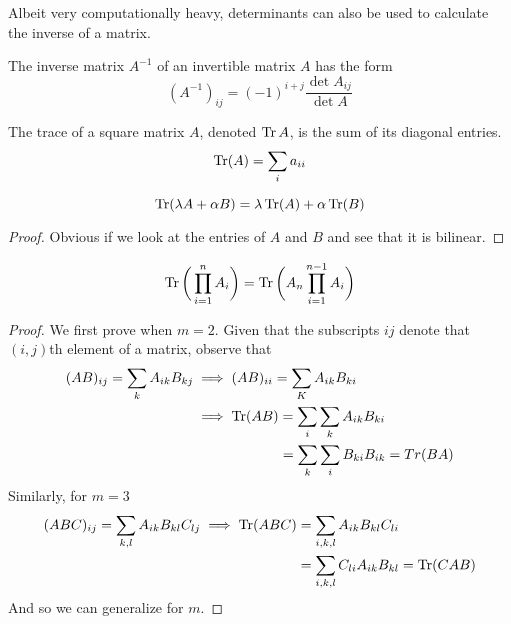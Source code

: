   Albeit very computationally heavy, determinants can also be used to calculate the inverse of a matrix. 

  \begin{theorem}
    The inverse matrix $A^{-1}$ of an invertible matrix $A$ has the form 
    \begin{equation}
      (A^{-1})_{i j} = (-1)^{i+j} \frac{\det{A_{i j}}}{\det{A}}
    \end{equation}
  \end{theorem}

  \begin{definition}
    The trace of a square matrix $A$, denoted $\Tr{A}$, is the sum of its diagonal entries. 
    \begin{equation}
      \Tr(A) = \sum_{i} a_{ii}
    \end{equation}
  \end{definition}

  \begin{proposition}
    \begin{equation}
      \Tr(\lambda A + \alpha B) = \lambda \Tr(A) + \alpha \Tr(B)
    \end{equation}
  \end{proposition}
  \begin{proof}
    Obvious if we look at the entries of $A$ and $B$ and see that it is bilinear.
  \end{proof}

  \begin{theorem}
    \begin{equation}
      \Tr{\bigg(\prod_{i=1}^n A_i\bigg)} = \Tr{\bigg(A_n \prod_{i=1}^{n-1} A_i\bigg)}
    \end{equation}
  \end{theorem}
  \begin{proof}
    We first prove when $m=2$. Given that the subscripts $i j$ denote that $(i,j)$th element of a matrix, observe that
    \begin{align*}
      (AB)_{ij} = \sum_{k} A_{ik} B_{kj} & \implies (AB)_{ii} = \sum_{K} A_{ik} B_{ki} \\
      & \implies \Tr(AB) = \sum_{i} \sum_{k} A_{ik} B_{ki} \\
      & \;\;\;\;\;\;\;\;\;\;\;\;\;\;\;\;\;\;\;\;\;\;= \sum_{k} \sum_{i} B_{ki} B_{ik} = Tr(BA)
    \end{align*}
    Similarly, for $m=3$
    \begin{align*}
      (ABC)_{ij} = \sum_{k,l} A_{ik} B_{kl} C_{lj} \implies \Tr(ABC) & = \sum_{i,k,l} A_{ik} B_{kl} C_{li} \\ 
                                                                     & = \sum_{i,k,l} C_{li} A_{ik} B_{kl} = \Tr(CAB)
    \end{align*}
    And so we can generalize for $m$. 
  \end{proof}

